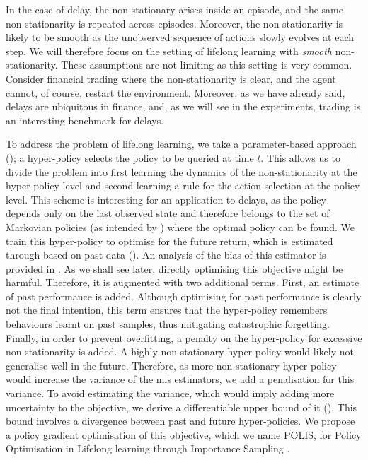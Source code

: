 In the case of delay, the non-stationary arises inside an episode, and the same non-stationarity is repeated across episodes.
Moreover, the non-stationarity is likely to be smooth as the unobserved sequence of actions slowly evolves at each step.
We will therefore focus on the setting of lifelong learning with \emph{smooth} non-stationarity.
These assumptions are not limiting as this setting is very common. 
Consider financial trading where the non-stationarity is clear, and the agent cannot, of course, restart the environment.
Moreover, as we have already said, delays are ubiquitous in finance, and, as we will see in the experiments, 
trading is an interesting benchmark for delays.

To address the problem of lifelong learning, we take a parameter-based approach ();
a hyper-policy selects the policy to be queried at time $t$. 
This allows us to divide the problem into first learning the dynamics of the non-stationarity at the hyper-policy level and second learning a rule for the action selection at the policy level.
This scheme is interesting for an application to delays, as the policy depends only on the last observed state and therefore belongs to the set of Markovian policies (as intended by \cite[Theorem~5.1]{derman2021acting}) where the optimal policy can be found.
We train this hyper-policy to optimise for the future return, which is estimated through  based on past data ().
An analysis of the bias of this estimator is provided in .
As we shall see later, directly optimising this objective might be harmful.
Therefore, it is augmented with two additional terms.
First, an estimate of past performance is added.
Although optimising for past performance is clearly not the final intention, this term ensures that the hyper-policy remembers behaviours learnt on past samples, thus mitigating catastrophic forgetting. 
Finally, in order to prevent overfitting, a penalty on the hyper-policy for excessive non-stationarity is added. 
A highly non-stationary hyper-policy would likely not generalise well in the future.
Therefore, as more non-stationary hyper-policy would increase the variance of the \gls{mis} estimators, we add a penalisation for this variance.
To avoid estimating the variance, which would imply adding more uncertainty to the objective, we derive a differentiable upper bound of it ().
This bound involves a divergence between past and future hyper-policies.
We propose a policy gradient optimisation of this objective, which we name POLIS, for Policy Optimisation in Lifelong learning through Importance Sampling .


